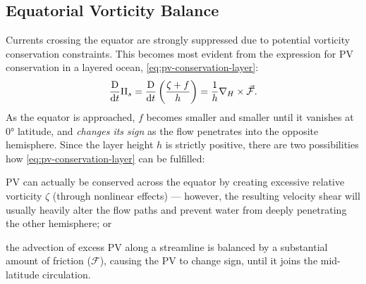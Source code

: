 \subsection{Equatorial Vorticity Balance}
\label{sec:equatorial-vorticity}
Currents crossing the equator are strongly suppressed due to potential vorticity conservation constraints. This becomes most evident from the expression for \ac{PV} conservation in a layered ocean, \eqref{eq:pv-conservation-layer}:
%
\begin{equation}
\frac{\text{D}}{\text{d}t}\Pi_s = \frac{\text{D}}{\text{d}t}\left(\frac{\zeta + f}{h}\right) = \frac{1}{h} \nabla_H\times \vec{\mathcal{F}}.
\end{equation}
%
As the equator is approached, \(f\) becomes smaller and smaller until it vanishes at \ang{0} latitude, and \emph{changes its sign} as the flow penetrates into the opposite hemisphere. Since the layer height \(h\) is strictly positive, there are two possibilities how \eqref{eq:pv-conservation-layer} can be fulfilled:
%
\begin{enum}
	\item \ac{PV} can actually be conserved across the equator by creating excessive relative vorticity \(\zeta\) (\ie through nonlinear effects) --- however, the resulting velocity shear will usually heavily alter the flow paths and prevent water from deeply penetrating the other hemisphere; or
	\item the advection of excess \ac{PV} along a streamline is balanced by a substantial amount of friction (\(\mathcal{F}\)), causing the \ac{PV} to change sign, until it joins the mid-latitude circulation.
\end{enum}
%

